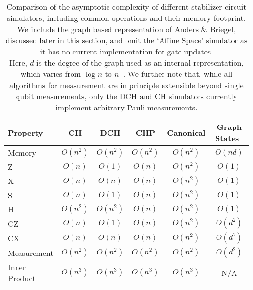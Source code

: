 \begin{table}[t]
\centering
\begin{tabular}{|l|c|c|c|c|c|}
\hline
Property & CH & DCH & CHP & Canonical & Graph States~\cite{Anders2006} \\
\hline
Memory & $O(n^{2})$ & $O(n^{2})$ & $O(n^{2})$ & $O(n^{2})$ & $O(nd)$\\
\hline
Z & $O(n)$ & $O(1)$ & $O(n)$ & $O(n^{2})$ & $O(1)$\\
X & $O(n)$ & $O(n)$ & $O(n)$ & $O(n^{2})$ & $O(1)$\\
S & $O(n)$ & $O(1)$ & $O(n)$ & $O(n^{2})$ & $O(1)$\\
H & $O(n^{2})$ & $O(n^{2})$ & $O(n)$ & $O(n^{2})$ & $O(1)$\\
CZ & $O(n)$ & $O(1)$ & $O(n)$ & $O(n^{2})$ & $O(d^{2})$\\
CX & $O(n)$ & $O(n)$ & $O(n)$ & $O(n^{2})$ & $O(d^{2})$\\
Measurement & $O(n^{2})$ & $O(n^{2})$ & $O(n^{2})$ & $O(n^{2})$ & $O(d^{2})$\\
Inner Product & $O(n^{3})$ & $O(n^{3})$ & $O(n^{3})$ & $O(n^{3})$ & N/A \\
\hline
\end{tabular}
\caption{Comparison of the asymptotic complexity of different stabilizer circuit simulators, including common operations and their memory footprint. We include the graph based representation of Anders \& Briegel, discussed later in this section, and omit the `Affine Space' simulator as it has no current implementation for gate updates.\\ Here, $d$ is the degree of the graph used as an internal representation, which varies from $\log{n}$ to $n$~\cite{Anders2006}. We further note that, while all algorithms for measurement are in principle extensible beyond single qubit measurements, only the DCH and CH simulators currently implement arbitrary Pauli measurements.}\label{tab:comparison}
\end{table}
